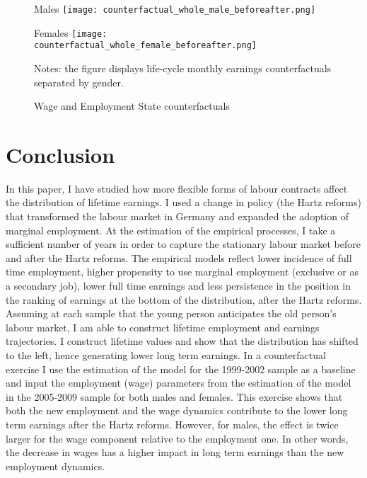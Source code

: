 \documentclass[12pt, a4paper]{article}
\let\Oldsection\section
\renewcommand{\section}{\FloatBarrier\Oldsection}
\begin{document}
\begin{figure}[!t]
	\centering
	\begin{minipage}[b]{0.48\textwidth}{Males}
		\centering
		\texttt{[image: counterfactual\_whole\_male\_beforeafter.png]}
	\end{minipage}
	\begin{minipage}[b]{0.48\textwidth}{Females}
		\centering
		\texttt{[image: counterfactual\_whole\_female\_beforeafter.png]}
	\end{minipage}
	\footnotesize{
		\justifying Notes: the figure displays life-cycle monthly earnings counterfactuals separated by gender.\par}
	\captionsetup{font=small,justification=raggedright}
	\caption{Wage and Employment State counterfactuals}\label{fig:counterfactual_profiles}
\end{figure}

\section{Conclusion}

In this paper, I have studied how more flexible forms of labour contracts affect the distribution of lifetime earnings. I used a change in policy (the Hartz reforms) that transformed the labour market in Germany and expanded the adoption of marginal employment. At the estimation of the empirical processes, I take a sufficient number of years in order to capture the stationary labour market before and after the Hartz reforms. The empirical models reflect lower incidence of full time employment, higher propensity to use marginal employment (exclusive or as a secondary job), lower full time earnings and less persistence in the position in the ranking of earnings at the bottom of the distribution, after the Hartz reforms. Assuming at each sample that the young person anticipates the old person's labour market, I am able to construct lifetime employment and earnings trajectories. I construct lifetime values and show that the distribution has shifted to the left, hence generating lower long term earnings. In a counterfactual exercise I use the estimation of the model for the 1999-2002 sample as a baseline and input the employment (wage) parameters from the estimation of the model in the 2005-2009 sample for both males and females. This exercise shows that both the new employment and the wage dynamics contribute to the lower long term earnings after the Hartz reforms. However, for males, the effect is twice larger for the wage component relative to the employment one. In other words, the decrease in wages has a higher impact in long term earnings than the new employment dynamics.
\end{document}
